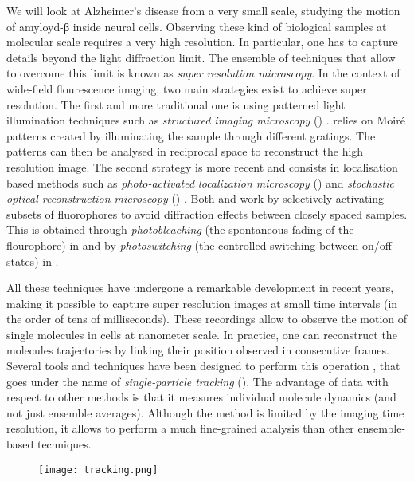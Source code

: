 We will look at Alzheimer's disease from a very small scale, studying the motion of amyloyd-β inside neural cells. Observing these kind of biological samples at molecular scale requires a very high resolution. In particular, one has to capture details beyond the light diffraction limit. The ensemble of techniques that allow to overcome this limit is known as \emph{super resolution microscopy}. In the context of wide-field flourescence imaging, two main strategies exist to achieve super resolution. The first and more traditional one is using patterned light illumination techniques such as \emph{structured imaging microscopy} () .  relies on Moiré patterns created by illuminating the sample through different gratings. The patterns can then be analysed in reciprocal space to reconstruct the high resolution image. The second strategy is more recent and consists in localisation based methods such as \emph{photo-activated localization microscopy} ()  and \emph{stochastic optical reconstruction microscopy} () . Both  and  work by selectively activating subsets of fluorophores to avoid diffraction effects between closely spaced samples. This is obtained through \emph{photobleaching} (the spontaneous fading of the flourophore) in  and by \emph{photoswitching} (the controlled switching between on/off states) in .

All these techniques have undergone a remarkable development in recent years, making it possible to capture super resolution images at small time intervals (in the order of tens of milliseconds). These recordings allow to observe the motion of single molecules in cells at nanometer scale. In practice, one can reconstruct the molecules trajectories by linking their position observed in consecutive frames. Several tools and techniques have been designed to perform this operation , that goes under the name of \emph{single-particle tracking} (). The advantage of  data with respect to other methods is that it measures individual molecule dynamics (and not just ensemble averages). Although the method is limited by the imaging time resolution, it allows to perform a much fine-grained analysis than other ensemble-based techniques.

\begin{figure}
  \texttt{[image: tracking.png]}
\end{figure}
